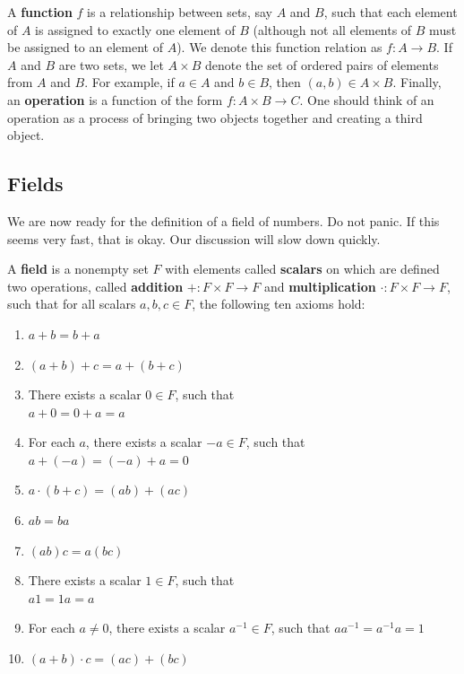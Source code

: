 A \textbf{function} $f$ is a relationship between sets, say $A$ and $B$, such that each element of $A$ is assigned to exactly one element of $B$ (although not all elements of $B$ must be assigned to an element of $A$). We denote this function relation as $f : A\to B$. If $A$ and $B$ are two sets, we let $A\times B$ denote the set of ordered pairs of elements from $A$ and $B$. For example, if $a\in A$ and $b\in B$, then $(a,b)\in A\times B$. Finally, an \textbf{operation} is a function of the form $f : A\times B \to C$. One should think of an operation as a process of bringing two objects together and creating a third object.\\

\subsection{Fields}
 We are now ready for the definition of a field of numbers. Do not panic. If this seems very fast, that is okay. Our discussion will slow down quickly.\\

\begin{Def}\label{def:field} A \textbf{field} is a nonempty set $F$ with elements called \textbf{scalars} on which are defined two operations, called \textbf{addition} $+ : F\times F \to F$ and \textbf{multiplication} $\cdot : F\times F \to F$, such that for all scalars $a, b, c \in F$, the following ten axioms hold:
\setlength{\columnsep}{30pt}
\begin{multicols}{2}
\begin{enumerate}[label=\emph{(\roman*)}, series=!DEF!]
\item\label{ax:addcom} $a+b=b+a$ 
\item\label{ax:addass} $(a+b)+c=a+(b+c)$ 
\item\label{ax:addid} There exists  a scalar $0\in F$, such that\\ $a + 0 = 0 + a = a$ 
\item\label{ax:addinv} For each $a$, there exists a scalar $-a \in F$, such that $a + (-a) = (-a) + a = 0$ 
\item $a\cdot (b+c) = (a b) + (a c)$\columnbreak
\item\label{ax:multcom} $ab=b a$ 
\item\label{ax:multass} $(a b)c=a(b c)$ 
\item\label{ax:multid} There exists  a scalar $1\in F$, such that\\ $a  1 = 1  a = a$ 
\item\label{ax:multinv} For each $a\neq 0$, there exists a scalar $a^{-1} \in F$, such that $a  a^{-1} = a^{-1}  a = 1$ 
\item $(a+b)\cdot c = (a c) + (b c)$
\end{enumerate}
\end{multicols}
\end{Def}

